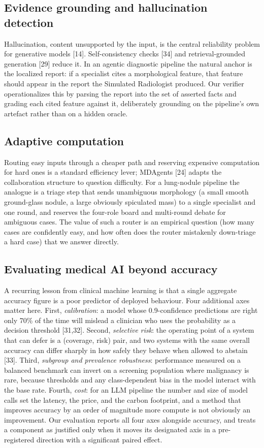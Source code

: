 \documentclass[12pt]{article}
\begin{document}
\subsection{Evidence grounding and hallucination detection}

Hallucination, content unsupported by the input, is the central reliability problem for generative models [14]. Self-consistency checks [34] and retrieval-grounded generation [29] reduce it. In an agentic diagnostic pipeline the natural anchor is the localized report: if a specialist cites a morphological feature, that feature should appear in the report the Simulated Radiologist produced. Our verifier operationalizes this by parsing the report into the set of asserted facts and grading each cited feature against it, deliberately grounding on the pipeline's own artefact rather than on a hidden oracle.

\subsection{Adaptive computation}

Routing easy inputs through a cheaper path and reserving expensive computation for hard ones is a standard efficiency lever; MDAgents [24] adapts the collaboration structure to question difficulty. For a lung-nodule pipeline the analogue is a triage step that sends unambiguous morphology (a small smooth ground-glass nodule, a large obviously spiculated mass) to a single specialist and one round, and reserves the four-role board and multi-round debate for ambiguous cases. The value of such a router is an empirical question (how many cases are confidently easy, and how often does the router mistakenly down-triage a hard case) that we answer directly.

\subsection{Evaluating medical AI beyond accuracy}

A recurring lesson from clinical machine learning is that a single aggregate accuracy figure is a poor predictor of deployed behaviour. Four additional axes matter here. First, \emph{calibration}: a model whose 0.9-confidence predictions are right only 70\% of the time will mislead a clinician who uses the probability as a decision threshold [31,32]. Second, \emph{selective risk}: the operating point of a system that can defer is a (coverage, risk) pair, and two systems with the same overall accuracy can differ sharply in how safely they behave when allowed to abstain [33]. Third, \emph{subgroup and prevalence robustness}: performance measured on a balanced benchmark can invert on a screening population where malignancy is rare, because thresholds and any class-dependent bias in the model interact with the base rate. Fourth, \emph{cost}: for an LLM pipeline the number and size of model calls set the latency, the price, and the carbon footprint, and a method that improves accuracy by an order of magnitude more compute is not obviously an improvement. Our evaluation reports all four axes alongside accuracy, and treats a component as justified only when it moves its designated axis in a pre-registered direction with a significant paired effect.
\end{document}
